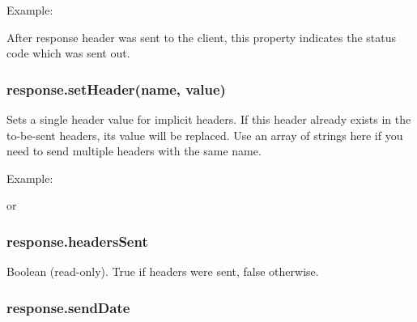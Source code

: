 Example:

\begin{Shaded}
\begin{Highlighting}[]
 \NormalTok{= }\NormalTok{;}
\end{Highlighting}
\end{Shaded}

After response header was sent to the client, this property indicates
the status code which was sent out.

\subsubsection{response.setHeader(name, value)}

Sets a single header value for implicit headers. If this header already
exists in the to-be-sent headers, its value will be replaced. Use an
array of strings here if you need to send multiple headers with the same
name.

Example:

\begin{Shaded}
\begin{Highlighting}[]
\NormalTok{(}\NormalTok{, }\NormalTok{);}
\end{Highlighting}
\end{Shaded}

or

\begin{Shaded}
\begin{Highlighting}[]
\NormalTok{(}\NormalTok{, [}\NormalTok{, }\NormalTok{]);}
\end{Highlighting}
\end{Shaded}

\subsubsection{response.headersSent}

Boolean (read-only). True if headers were sent, false otherwise.

\subsubsection{response.sendDate}

